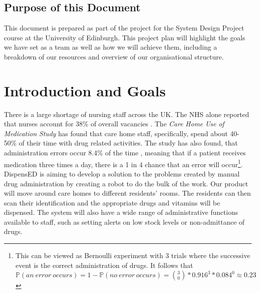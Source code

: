 \documentclass[a4paper,10pt,DIV10,openright,openbib]{scrreprt}
\begin{document}
\section*{Purpose of this Document}
This document is prepared as part of the project for the System Design Project course
at the University of Edinburgh. This project plan will highlight the goals we
have set as a team as well as how we will achieve them, including a breakdown
of our resources and overview of our organisational structure.
\vspace{2cm}
{\let\clearpage\relax  \chapter{Introduction and Goals}}

There is a large shortage of nursing staff across the UK. The NHS alone reported
that nurses account for 38\% of overall vacancies \cite{NHS}.
The \textit{Care Home Use of Medication Study} has found that care home staff, specifically, spend about 40-50\% of their time with drug
related activities. The study has also found, that administration errors occur
8.4\% of the time \cite{CHUMS}, meaning that if a patient receives medication
three times a day, there is a 1 in 4 chance that an error will
occur\footnote{This can be viewed as Bernoulli experiment with 3 trials where the successive
  event is the correct administration of drugs. It follows that
  $\mathbb{P}(an\ error\ occurs) = 1 - \mathbb{P}(no\ error\ occurs) =
  \binom{3}{0}*0.916^3*0.084^0 \approx 0.23$}. \\
DispensED is aiming to develop a solution to the problems created by manual drug
administration by creating a robot to do the bulk of the work. Our product will
move around care homes to different residents' rooms. The residents can then
scan their identification and the appropriate drugs and vitamins will be
dispensed. The system will also have a wide range of administrative functions
available to staff, such as setting alerts on low stock levels or non-admittance of drugs.
\end{document}
